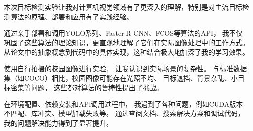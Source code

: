 
本次目标检测实验让我对计算机视觉领域有了更深入的理解，特别是对主流目标检测算法的原理、部署和应用有了实践经验。

通过亲手部署和调用YOLO系列、Faster R-CNN、FCOS等算法的API，
我不仅巩固了这些算法的理论知识，更直观地理解了它们在实际图像处理中的工作方式。
从论文中的抽象概念到代码中的具体实现，这种结合极大地加深了我的学习效果。

使用自行拍摄的校园图像进行实验，
让我认识到实际场景的复杂性。
与标准数据集（如COCO）相比，校园图像可能存在光照不均、
目标遮挡、背景杂乱、小目标密集等问题，
这些都对算法的鲁棒性提出了挑战。

在环境配置、依赖安装和API调用过程中，
我遇到了各种问题，例如CUDA版本不匹配、库冲突、模型加载失败等。
通过查阅文档、搜索解决方案和调试代码，我的问题解决能力得到了显著提升。

